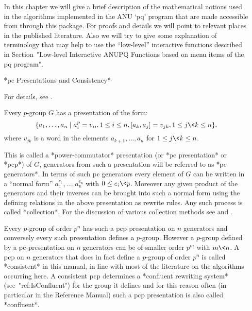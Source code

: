 

In this chapter  we will give a brief  description of the mathematical
notions used in the algorithms  implemented in the ANU `pq' program
that are made accessible from {\GAP} through this package.  For proofs
and  details  we  will  point  to relevant  places  in  the  published
literature.  Also we will try  to give some explanation of terminology
that may help to use the ``low-level'' interactive functions described
in Section~"Low-level Interactive ANUPQ  Functions based on menu items
of the pq program".


*pc Presentations and Consistency*

For details, see \cite{NNN98}.

Every $p$-group $G$ has a presentation of the form: 
$$
\{a_1,\dots,a_n \mid a_i^p = v_{ii}, 1 \le i \le n, 
               [a_k, a_j] = v_{jk}, 1 \le j \< k \le n \}.  
$$
where $v_{jk}$ is a word in the elements $a_{k+1},\dots,a_n$ for 
$1 \le j \< k \le n$.

This is called a *power-commutator* presentation (or *pc presentation*
or *pcp*) of $G$, generators from such a presentation will be referred
to as *pc generators*. In terms of such pc generators every element of
$G$ can be written in a  ``normal  form''  $a_1^{e_1},\dots,a_n^{e_n}$
with $0 \le e_i \< p$. Moreover any given product  of  the  generators
and their inverses can be brought into such a normal  form  using  the
defining relations in the above presentation  as  rewrite  rules.  Any
such process is called *collection*. For  the  discussion  of  various
collection methods see \cite{LGS90} and \cite{Vau90a}.

Every $p$-group of order $p^n$ has such  a  pcp  presentation  on  $n$
generators and conversely every such presentation defines a $p$-group.
However a $p$-group defined by a pc-presentation on $n$ generators can
be of smaller order $p^m$ with $m\<n$. A pcp on  $n$  generators  that
does in fact define a $p$-group of order $p^n$ is called  *consistent*
in this manual, in line with most of the literature on the  algorithms
occurring here. A consistent pcp  determines  a  *confluent  rewriting
system* (see~"ref:IsConfluent") for the group it defines and for  this
reason often (in particular in the {\GAP} Reference Manual) such a pcp
presentation is also called *confluent*.

